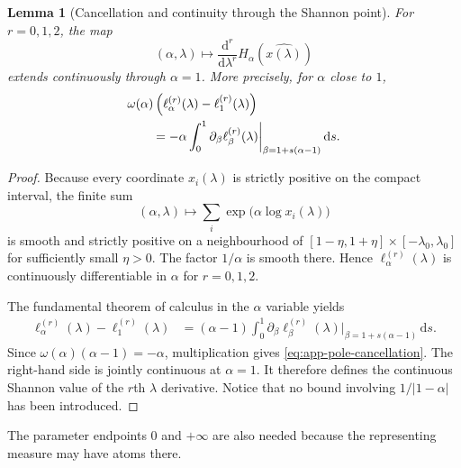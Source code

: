 \documentclass[aps,pra,11pt,onecolumn,nofootinbib,tightenlines]{revtex4-2}
\newtheorem{lemma}[theorem]{Lemma}
\theoremstyle{definition}
\begin{document}
\begin{lemma}[Cancellation and continuity through the Shannon point]
\label{lem:app-Shannon-cancellation}
For $r=0,1,2$, the map
\begin{equation}
 (\alpha,\lambda)\longmapsto
 \frac{\mathrm d^r}{\mathrm d\lambda^r}
 H_\alpha(\widehat{x(\lambda)})
 \label{eq:app-H-r-map}
\end{equation}
extends continuously through $\alpha=1$.  More precisely, for $\alpha$ close to $1$,
\begin{align}
 &\omega(\alpha)
 \left(
  \ell_\alpha^{(r)}(\lambda)-\ell_1^{(r)}(\lambda)
 \right)
 \notag\\
 &\qquad=-\alpha\int_0^1
 \partial_\beta
 \ell_\beta^{(r)}(\lambda)\bigg|_{\beta=1+s(\alpha-1)}
 \,\mathrm ds.
 \label{eq:app-pole-cancellation}
\end{align}
\end{lemma}

\begin{proof}
Because every coordinate $x_i(\lambda)$ is strictly positive on the compact interval, the finite sum
\begin{equation}
 (\alpha,\lambda)\longmapsto
 \sum_i\exp\bigl(\alpha\log x_i(\lambda)\bigr)
 \label{eq:app-smooth-power-sum}
\end{equation}
is smooth and strictly positive on a neighbourhood of
$[1-\eta,1+\eta]\times[-\lambda_0,\lambda_0]$ for sufficiently small $\eta>0$.  The factor $1/\alpha$ is smooth there.  Hence $\ell_\alpha^{(r)}(\lambda)$ is continuously differentiable in $\alpha$ for $r=0,1,2$.

The fundamental theorem of calculus in the $\alpha$ variable yields
\begin{align}
 \ell_\alpha^{(r)}(\lambda)-\ell_1^{(r)}(\lambda)
 &=(\alpha-1)\int_0^1
 \partial_\beta\ell_\beta^{(r)}(\lambda)\bigg|_{\beta=1+s(\alpha-1)}
 \,\mathrm ds.
 \label{eq:app-alpha-FTC}
\end{align}
Since $\omega(\alpha)(\alpha-1)=-\alpha$, multiplication gives \eqref{eq:app-pole-cancellation}.  The right-hand side is jointly continuous at $\alpha=1$.  It therefore defines the continuous Shannon value of the $r$th $\lambda$ derivative.  Notice that no bound involving $1/|1-\alpha|$ has been introduced.
\end{proof}

The parameter endpoints $0$ and $+\infty$ are also needed because the representing measure may have atoms there.
\end{document}

